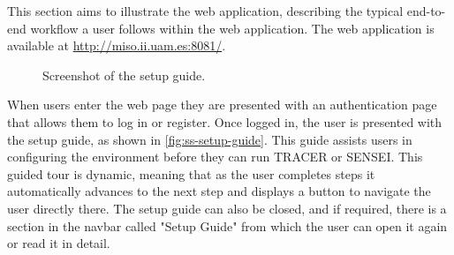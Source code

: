 This section aims to illustrate the web application,
describing the typical end-to-end workflow
a user follows within the web application.
The web application is available at \url{http://miso.ii.uam.es:8081/}.

\begin{figure}[htpb]
  \centering
  \caption{Screenshot of the setup guide.}
  \label{fig:ss-setup-guide}
\end{figure}

When users enter the web page
they are presented with an authentication page
that allows them to log in or register.
Once logged in,
the user is presented with the setup guide,
as shown in \autoref{fig:ss-setup-guide}.
This guide assists users in configuring the environment
before they can run \ac{TRACER} or SENSEI.
This guided tour is dynamic,
meaning that as the user completes steps
it automatically advances to the next step
and displays a button to navigate the user directly there.
The setup guide can also be closed,
and if required, there is a section in the navbar called "Setup Guide"
from which the user can open it again or read it in detail.

